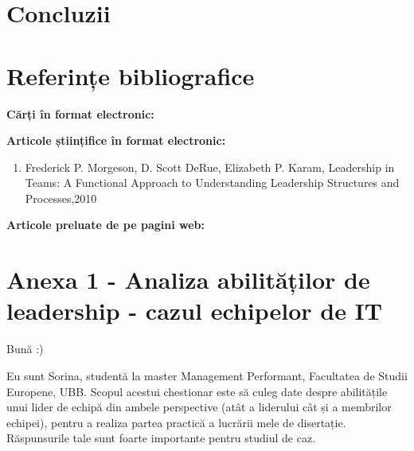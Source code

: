 \documentclass[a4paper, 12pt]{article}
\begin{document}
\setcounter{section}{3}
	\section{Concluzii}	


\newpage

	\section*{Referințe bibliografice}
	\space
	\bigskip
	\bigskip

	\textbf{Cărți în format electronic:}
	

	\textbf{Articole științifice în format electronic:}
	\begin{enumerate}[1.]
		\item Frederick P. Morgeson, D. Scott DeRue, Elizabeth P. Karam, Leadership in Teams: A Functional Approach to Understanding Leadership Structures and Processes,2010 
	\end{enumerate}

	\textbf{Articole preluate de pe pagini web:}




\newpage
	\section*{Anexa 1 - Analiza abilităților de leadership - cazul echipelor de IT }	

	\thispagestyle{empty}
	 
	\qquad\space Bună :)

      \quad Eu sunt Sorina, studentă la master Management Performant, Facultatea de Studii Europene, UBB. Scopul acestui chestionar este să culeg date despre abilitățile unui lider de echipă din ambele perspective (atât a liderului cât și a membrilor echipei), pentru a realiza partea practică a lucrării mele de disertație. Răspunsurile tale sunt foarte importante pentru studiul de caz.
\end{document}

